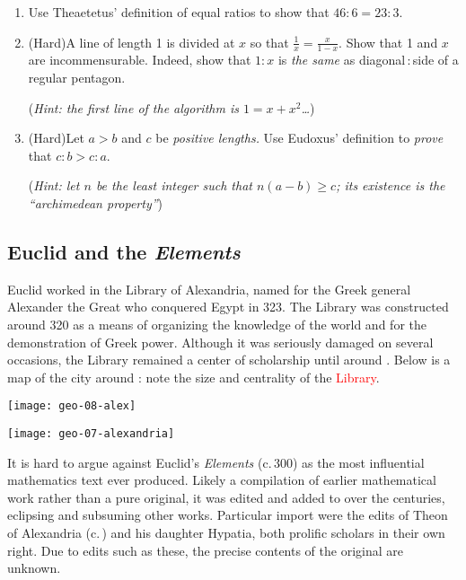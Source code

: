\begin{exercises}{}{}
\begin{enumerate}
  \item%
	Use Theaetetus' definition of equal ratios to show that $46:6=23:3$.
  
  \item%
  (Hard)\lstsp A line of length 1 is divided at $x$ so that $\frac 1x=\frac x{1-x}$. Show that 1 and $x$ are incommensurable. Indeed, show that $1:x$ is \emph{the same} as diagonal\,:\,side of a regular pentagon.\par
  (\emph{Hint: the first line of the algorithm is $1=x+x^2$\ldots})
  
  \item%
  (Hard)\lstsp Let $a>b$ and $c$ be \emph{positive lengths.} Use Eudoxus' definition to \emph{prove} that $c:b>c:a$.\par
  (\emph{Hint: let $n$ be the least integer such that $n(a-b)\ge c$; its existence is the ``archimedean property''})
\end{enumerate}
\end{exercises}


\clearpage

\subsection{Euclid and the \emph{Elements}}

\begin{minipage}[t]{0.70\linewidth}\vspace{-8pt}
Euclid worked in the Library of Alexandria, named for the Greek general Alexander the Great who conquered Egypt in 323\BC. The Library was constructed around 320\BC{} as a means of organizing the knowledge of the world and for the demonstration of Greek power. Although it was seriously damaged on several occasions, the Library remained a center of scholarship until around . Below is a map of the city around : note the size and centrality of the \textcolor{red}{Library}.
\end{minipage}\hfill
\begin{minipage}[t]{0.29\linewidth}\vspace{-25pt}
\flushright\texttt{[image: geo-08-alex]}
\end{minipage}\par

\begin{center}
\texttt{[image: geo-07-alexandria]}
\end{center}

It is hard to argue against Euclid's \emph{Elements} (c.\,300\BC{}) as the most influential mathematics text ever produced. Likely a compilation of earlier mathematical work rather than a pure original, it was edited and added to over the centuries, eclipsing and subsuming other works. Particular import were the edits of Theon of Alexandria (c.\,) and his daughter Hypatia, both prolific scholars in their own right. Due to edits such as these, the precise contents of the original are unknown.\smallbreak

